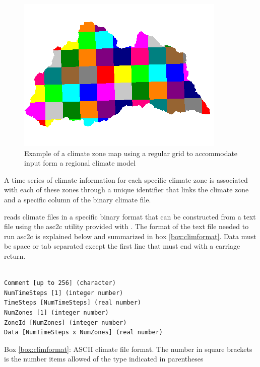 \begin{center}
\begin{figure}
\includegraphics[scale=1]{./figures/ClimateZones.png} 
\caption{Example of a climate zone map using a regular grid to accommodate input form a regional climate model}\label{fig:ClimZone}
\end{figure}
\end{center}


A time series of climate information for each specific climate zone is associated with each of these zones through a unique identifier that links the climate zone and a specific column of the binary climate file.     

\echo reads climate files in a specific binary format that can be constructed from a text file using the \textsf{asc2c} utility provided with \echo. The format of the text file needed to run \textsf{asc2c} is explained below and summarized in box \ref{box:climformat}. Data must be space or tab separated except the first line that must end with a carriage return.  

\begin{center}
\begin{Frame}
\label{box:climformat}
\begin{verbatim}

Comment [up to 256] (character)
NumTimeSteps [1] (integer number)
TimeSteps [NumTimeSteps] (real number)
NumZones [1] (integer number)
ZoneId [NumZones] (integer number)
Data [NumTimeSteps x NumZones] (real number)

\end{verbatim}
\end{Frame}
Box \ref{box:climformat}: ASCII climate file format. The number in square brackets is the number items allowed of the type indicated in parentheses
\end{center}


